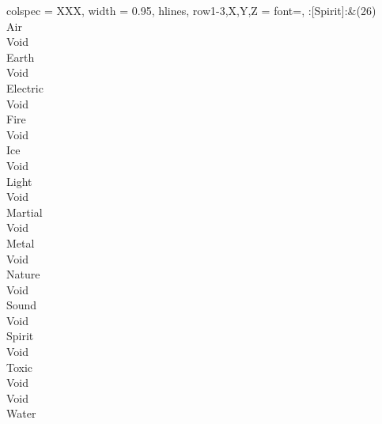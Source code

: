 \begin{longtblr}[
	caption = {2v1 Defending Weak},
	label = {2v1-Defending-Weak},
]{
	colspec = {XXX}, width = 0.95\linewidth,
	hlines,
	row{1-3,X,Y,Z} = {font=\bfseries},
}
	:[Spirit]:&{(26)\\
	Air \\
	Void \\
	Earth \\
	Void \\
	Electric \\
	Void \\
	Fire \\
	Void \\
	Ice \\
	Void \\
	Light \\
	Void \\
	Martial \\
	Void \\
	Metal \\
	Void \\
	Nature \\
	Void \\
	Sound \\
	Void \\
	Spirit \\
	Void \\
	Toxic \\
	Void \\
	Void \\
	Water \\
	}\\

\end{longtblr}
\onecolumn
